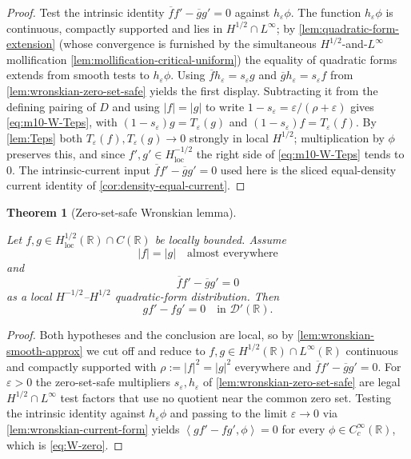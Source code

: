\documentclass[11pt,oneside]{book}
\providecommand{\uses}[1]{}
\newtheorem{theorem}{Theorem}[chapter]
\theoremstyle{definition}
\theoremstyle{remark}
\newcommand{\R}{\mathbb R}
\newcommand{\D}{\mathcal D}
\newcommand{\1}{\mathbf 1}
\newcommand{\loc}{\mathrm{loc}}
\newcommand{\pair}[2]{\left\langle #1,#2\right\rangle}
\newcommand{\eps}{\varepsilon}
\begin{document}
\begin{proof}
\uses{lem:quadratic-form-extension, lem:mollification-critical-uniform, lem:Teps, cor:density-equal-current}
Test the intrinsic identity $\overline f f'-\overline g g'=0$ against
$h_\eps\phi$. The function $h_\eps\phi$ is continuous, compactly supported
and lies in $H^{1/2}\cap L^\infty$; by \cref{lem:quadratic-form-extension}
(whose convergence is furnished by the simultaneous $H^{1/2}$-and-$L^\infty$
mollification \cref{lem:mollification-critical-uniform}) the equality of
quadratic forms extends from smooth tests to $h_\eps\phi$. Using
$\overline f h_\eps=s_\eps g$ and $\overline g h_\eps=s_\eps f$ from
\cref{lem:wronskian-zero-set-safe} yields the first display. Subtracting it
from the defining pairing of $D$ and using $|f|=|g|$ to write
$1-s_\eps=\eps/(\rho+\eps)$ gives \eqref{eq:m10-W-Teps}, with
$(1-s_\eps)g=T_\eps(g)$ and $(1-s_\eps)f=T_\eps(f)$. By \cref{lem:Teps}
both $T_\eps(f),T_\eps(g)\to0$ strongly in local $H^{1/2}$; multiplication
by $\phi$ preserves this, and since $f',g'\in H^{-1/2}_{\loc}$ the right
side of \eqref{eq:m10-W-Teps} tends to $0$. The intrinsic-current input
$\overline f f'-\overline g g'=0$ used here is the sliced equal-density
current identity of \cref{cor:density-equal-current}.
\end{proof}

\begin{theorem}[Zero-set-safe Wronskian lemma]\label{thm:critical-wronskian}
\uses{def:Hs-space, def:Hs-loc, def:Hs-neg-pairing}
Let $f,g\in H^{1/2}_{\loc}(\R)\cap C(\R)$ be locally bounded. Assume
\begin{equation}
 |f|=|g|\quad\text{almost everywhere}                \label{eq:W-density}
\end{equation}
and
\begin{equation}
 \overline f f'-\overline g g'=0                     \label{eq:W-log}
\end{equation}
as a local $H^{-1/2}$--$H^{1/2}$ quadratic-form distribution. Then
\begin{equation}
 g f'-f g'=0\quad\text{in }\D'(\R).                  \label{eq:W-zero}
\end{equation}
\end{theorem}

\begin{proof}
\uses{lem:wronskian-smooth-approx, lem:wronskian-zero-set-safe, lem:wronskian-current-form}
Both hypotheses and the conclusion are local, so by
\cref{lem:wronskian-smooth-approx} we cut off and reduce to $f,g\in
H^{1/2}(\R)\cap L^\infty(\R)$ continuous and compactly supported with
$\rho:=|f|^2=|g|^2$ everywhere and $\overline f f'-\overline g g'=0$. For
$\eps>0$ the zero-set-safe multipliers $s_\eps,h_\eps$ of
\cref{lem:wronskian-zero-set-safe} are legal $H^{1/2}\cap L^\infty$ test
factors that use no quotient near the common zero set. Testing the intrinsic
identity against $h_\eps\phi$ and passing to the limit $\eps\to0$ via
\cref{lem:wronskian-current-form} yields $\pair{gf'-fg'}{\phi}=0$ for every
$\phi\in C_c^\infty(\R)$, which is \eqref{eq:W-zero}.
\end{proof}
\end{document}
